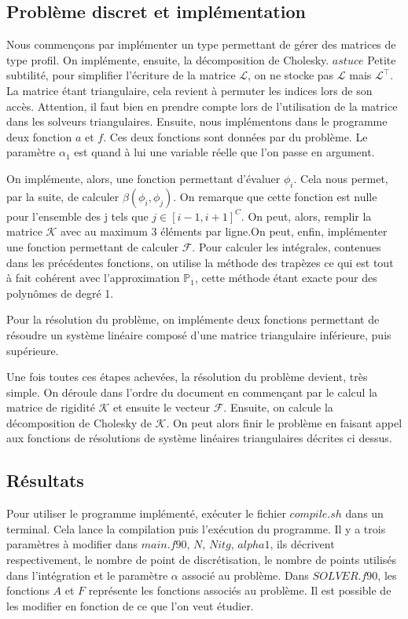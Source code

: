 \documentclass[a4paper,french,10pt]{article}
\begin{document}
\subsection{Problème discret et implémentation}
Nous commençons par implémenter un type permettant de gérer des matrices de type profil. On implémente, ensuite, la décomposition de Cholesky. 
\newline $astuce$
\newline Petite subtilité, pour simplifier l'écriture de la matrice $\mathcal{L}$, on ne stocke pas $\mathcal{L}$ mais $\mathcal{L}^\intercal$. La matrice étant triangulaire, cela revient à permuter les indices lors de son accès. Attention, il faut bien en prendre compte lors de l'utilisation de la matrice dans les solveurs triangulaires.
\newline\newline Ensuite, nous implémentons dans le programme deux fonction $a$ et $f$. Ces deux fonctions sont données par du problème. Le paramètre $\alpha_1$ est quand à lui une variable réelle que l'on passe en argument.

On implémente, alors, une fonction permettant d'évaluer $\phi_i$. Cela nous permet, par la suite, de calculer $\beta(\phi_i,\phi_j)$. On remarque que cette fonction est nulle pour l'ensemble des j tels que $j \in [i-1,i+1]^C$. On peut, alors, remplir la matrice $\mathcal{K}$ avec au maximum 3 éléments par ligne.On peut, enfin, implémenter une fonction permettant de calculer $\mathcal{F}$.
Pour calculer les intégrales, contenues dans les précédentes fonctions, on utilise la méthode des trapèzes ce qui est tout à fait cohérent avec l'approximation $\mathds{P}_1$, cette méthode étant exacte pour des polynômes de degré 1.

Pour la résolution du problème, on implémente deux fonctions permettant de résoudre un système linéaire composé d'une matrice triangulaire inférieure, puis supérieure.

Une fois toutes ces étapes achevées, la résolution du problème devient, très simple. On déroule dans l'ordre du document en commençant par le calcul la matrice de rigidité $\mathcal{K}$ et ensuite le vecteur $\mathcal{F}$. Ensuite, on calcule la décomposition de Cholesky de $\mathcal{K}$. On peut alors finir le problème en faisant appel aux fonctions de résolutions de système linéaires triangulaires décrites ci dessus.
\newpage
\subsection{Résultats}
	Pour utiliser le programme implémenté, exécuter le fichier $compile.sh$ dans un terminal. Cela lance la compilation puis l’exécution du programme. Il y a trois paramètres à modifier dans $main.f90$, $N$, $Nitg$, $alpha1$, ils décrivent respectivement, le nombre de point de discrétisation, le nombre de points utilisés dans l'intégration et le paramètre $\alpha$ associé au problème. Dans $SOLVER.f90$, les fonctions $A$ et $F$ représente les fonctions associés au problème. Il est possible de les modifier en fonction de ce que l'on veut étudier.
    
\end{document}
